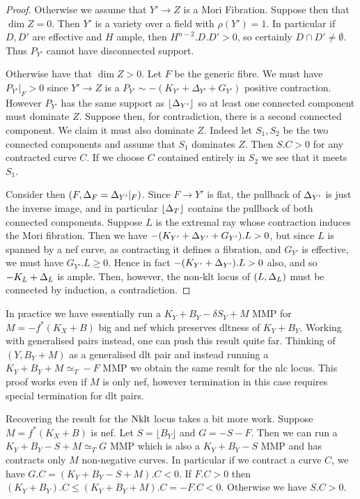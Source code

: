 \begin{proof}
	Otherwise we assume that $Y' \to Z$ is a Mori Fibration. Suppose then that $\dim Z=0$. Then $Y'$ is a variety over a field with $\rho(Y')=1$. In particular if $D,D'$ are effective and $H$ ample, then $H^{n-2}.D.D' >0$, so certainly $D\cap D' \neq \emptyset$. Thus $P_{Y'}$ cannot have disconnected support.
	
	Otherwise have that $\dim Z > 0 $. Let $F$ be the generic fibre. We must have $P_{Y'}|_{F}> 0$ since $Y' \to Z$ is a $P_{Y'}\sim -(K_{Y'}+\Delta_{Y'}+G_{Y'})$ positive contraction. However $P_{Y'}$ has the same support as $\lfloor \Delta_{Y'} \rfloor$ so at least one connected component must dominate $Z$. Suppose then, for contradiction, there is a second connected component. We claim it must also dominate $Z$. Indeed let $S_{1},S_{2}$ be the two connected components and assume that $S_{1}$ dominates $Z$. Then $S.C > 0$ for any contracted curve $C$. If we choose $C$ contained entirely in $S_{2}$ we see that it meets $S_{1}$.

	Consider then $(F,\Delta_{F}=\Delta_{Y'}|_{F})$. Since $F \to Y'$ is flat, the pullback of $\Delta_{Y'}$ is just the inverse image, and in particular $\lfloor \Delta_{T} \rfloor$ contains the pullback of both connected components. Suppose $L$ is the extremal ray whose contraction induces the Mori fibration. Then we have $-(K_{Y'}+\Delta_{Y'}+G_{Y'}).L >0$, but since $L$ is spanned by a nef curve, as contracting it defines a fibration, and $G_{Y'}$ is effective, we must have $G_{Y'}.L \geq 0$. Hence in fact $-(K_{Y'}+\Delta_{Y'}).L >0$ also, and so $-K_{L}+\Delta_{L}$ is ample. Then, however, the non-klt locus of $(L,\Delta_{L})$ must be connected by induction, a contradiction.

\end{proof}


In practice we have essentially run a $K_{Y}+B_{Y}-\delta S_{Y}+ M$ MMP for $M=-f^{*}(K_{X}+B)$ big and nef which preserves dltness of $K_{Y}+B_{Y}$. Working with generalised pairs instead, one can push this result quite far. Thinking of $(Y,B_{Y}+M)$ as a generalised dlt pair and instead running a $K_{Y}+B_{Y}+M\simeq_{T} -F$ MMP we obtain the same result for the nlc locus. This proof works even if $M$ is only nef, however termination in this case requires special termination for dlt pairs.

Recovering the result for the $\textup{Nklt}$ locus takes a bit more work. Suppose $M=f^{*}(K_{X}+B)$ is nef. Let $S=\lfloor B_{Y} \rfloor$ and $G=-S- F$. Then we can run a $K_{Y}+B_{Y}-S+M \simeq_{T}G$ MMP which is also a $K_{Y}+B_{Y}-S$ MMP and has contracts only $M$ non-negative curves. In particular if we contract a curve $C$, we have $G.C=(K_{Y}+B_{Y}-S+M).C <0$. If $F.C >0$ then $(K_{Y}+B_{Y}).C \leq (K_{Y}+B_{Y}+M).C=-F.C < 0$. Otherwise we have $S.C >0$. 

